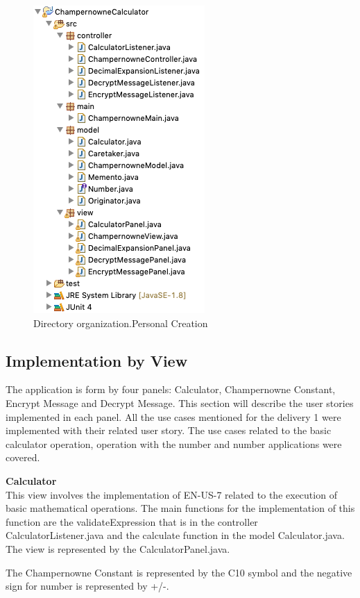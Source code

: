 \documentclass{report}
\begin{document}
\begin{figure}[H]
\includegraphics[scale=0.8]{images/directories.png}
\caption[Directory organization]{Directory organization.Personal Creation}
\end{figure}

\subsection{Implementation by View}

The application is form by four panels: Calculator, Champernowne Constant, Encrypt Message and Decrypt Message. This section will describe the user stories implemented in each panel. All the use cases mentioned for the delivery 1 were implemented with their related user story. The use cases related to the basic calculator operation, operation with the number and number applications were covered. \newline

\textbf{Calculator} \\

This view involves the implementation of EN-US-7 related to the execution of basic mathematical operations. The main functions for the implementation of this function are the validateExpression that is in the controller CalculatorListener.java and the calculate function in the model Calculator.java. The view is represented by the CalculatorPanel.java.

The Champernowne Constant is represented by the C10 symbol and the negative sign for number is represented by +/-.
\end{document}
